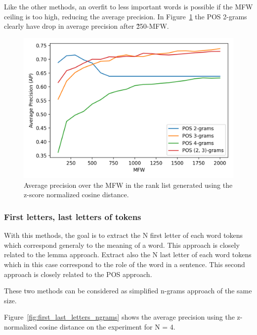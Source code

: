 Like the other methods, an overfit to less important words is possible if the MFW ceiling is too high, reducing the average precision.
In Figure~\ref{fig:pos_ngrams} the POS 2-grams clearly have drop in average precision after \~250-MFW.

\begin{figure}
  \includegraphics[width=\linewidth]{img/pos_ngrams.png}
  \caption{Average precision over the MFW in the rank list generated using the z-score normalized cosine distance.}
  \label{fig:pos_ngrams}
\end{figure}

\subsubsection{First letters, last letters of tokens}

With this methods, the goal is to extract the N first letter of each word tokens which correspond generaly to the meaning of a word.
This approach is closely related to the lemma approach.
Extract also the N last letter of each word tokens which in this case correspond to the role of the word in a sentence.
This second approach is closely related to the POS approach.

These two methods can be considered as simplified n-grams approach of the same size.

Figure~\ref{fig:first_last_letters_ngrams} shows the average precision using the z-normalized cosine distance on the experiment for N = 4.

